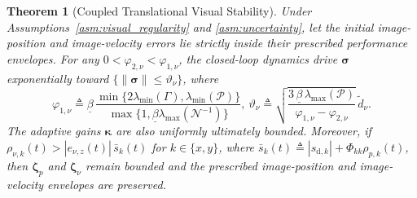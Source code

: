 \documentclass[10pt,conference]{IEEEtran}
\newtheorem{theorem}{Theorem}
\begin{document}
\begin{theorem}[Coupled Translational Visual Stability]
\label{thm:translational}
Under Assumptions~\ref{asm:visual_regularity} and \ref{asm:uncertainty}, let the initial image-position and image-velocity errors lie strictly inside their prescribed performance envelopes. For any $0<\varphi_{2,\nu}<\varphi_{1,\nu}$, the closed-loop dynamics drive $\boldsymbol\sigma$ exponentially toward $\{\|\boldsymbol\sigma\|\le\vartheta_\nu\}$, where
\begin{equation*}
    \varphi_{1,\nu} \triangleq \underline\beta\, \frac{\min\{2\lambda_{\min}(\Gamma), \lambda_{\min}(\mathcal P)\}}{\max\{1,\underline\beta\lambda_{\max}(\mathcal N^{-1})\}}, ~ \vartheta_\nu \triangleq \sqrt{\frac{3\,\underline\beta\,\lambda_{\max}(\mathcal P)}{\varphi_{1,\nu}-\varphi_{2,\nu}}}\,\tilde d_\nu.
\end{equation*}
The adaptive gains $\boldsymbol\kappa$ are also uniformly ultimately bounded. 
Moreover, if $\rho_{\nu,k}(t) > |e_{\nu,z}(t)|\,\bar{s}_k(t)$ for $k\in\{x,y\}$, where $\bar s_k(t) \triangleq |s_{\mathrm d,k}| + \Phi_{kk} \rho_{p,k}(t)$, then $\boldsymbol\zeta_p$ and $\boldsymbol\zeta_\nu$ remain bounded and the prescribed image-position and image-velocity envelopes are preserved.
\end{theorem}
\end{document}
